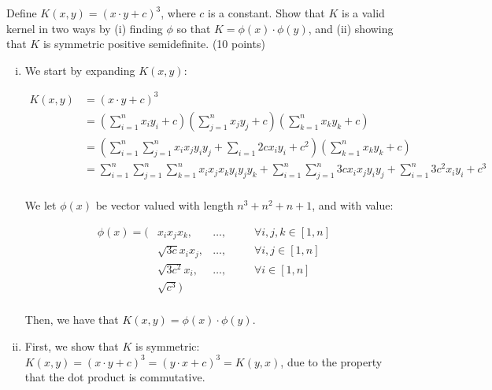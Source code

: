 \documentclass[fleqn]{homework}
\begin{document}
  \begin{problem}{2}
    \begin{question}
      Define $K(x,y)=(x \cdot y+c)^3$, where $c$ is a constant. Show that $K$ is
      a valid kernel in two ways by (i) finding $\phi$ so that
      $K = \phi(x) \cdot \phi(y)$, and (ii) showing that $K$ is symmetric
      positive semidefinite. (10 points)
    \end{question}

    \begin{enumerate}[(i)]
    \item We start by expanding $K(x,y)$:

      \begin{align*}
        K(x,y) &= (x \cdot y + c)^3 \\
               &= \left(\sum_{i=1}^n x_i y_i + c\right)\left(\sum_{j=1}^n x_j y_j + c\right)\left(\sum_{k=1}^n x_k y_k + c\right)\\
               &= \left(\sum_{i=1}^n \sum_{j=1}^n x_ix_jy_iy_j + \sum_{i=1} 2cx_iy_i + c^2\right)\left(\sum_{k=1}^n x_k y_k + c\right)\\
               &= \sum_{i=1}^n \sum_{j=1}^n \sum_{k=1}^n x_ix_jx_k y_iy_jy_k + \sum_{i=1}^n \sum_{j=1}^n 3cx_ix_jy_iy_j + \sum_{i=1}^n 3c^2x_iy_i + c^3 \\
      \end{align*}

      We let $\phi(x)$ be vector valued with length $n^3 + n^2 + n + 1$, and
      with value:

      \begin{align*}
        \phi(x) = (&x_i x_j x_k, &\dots, &&\:\:\:\: \forall i,j,k \in [1,n] \\
        &\sqrt{3c} x_i x_j, &\dots, &&\:\:\:\: \forall i,j \in [1,n] \\
        &\sqrt{3c^2} x_i, &\dots, &&\:\:\:\: \forall i \in [1,n] \\
        & \sqrt{c^3})\\
      \end{align*}

      Then, we have that $K(x,y) = \phi(x) \cdot \phi(y)$.
    \item First, we show that $K$ is symmetric:
      $K(x,y) = (x \cdot y + c)^3 = (y \cdot x + c)^3 = K(y,x)$, due to the
      property that the dot product is commutative.
    \end{enumerate}
  \end{problem}
\end{document}
